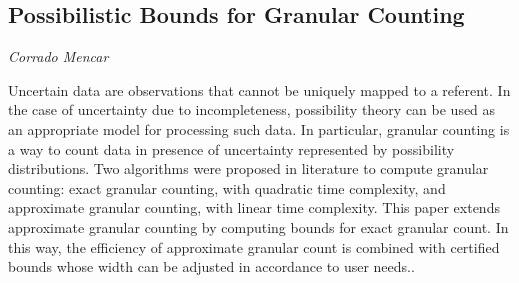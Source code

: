 \documentclass[../booklet.tex]{subfiles}
\begin{document}
\subsection[Possibilistic Bounds for Granular Counting. {\it Corrado Mencar}]{Possibilistic Bounds for Granular Counting}

\begin{center}
  {\it Corrado Mencar}
\end{center}

\vskip 0.8cm


Uncertain data are observations that cannot be uniquely mapped to
a referent. In the case of uncertainty due to incompleteness, possibility
theory can be used as an appropriate model for processing such data.
In particular, granular counting is a way to count data in presence
of uncertainty represented by possibility distributions. Two algorithms
were proposed in literature to compute granular counting: exact granular
counting, with quadratic time complexity, and approximate granular
counting, with linear time complexity. This paper extends approximate
granular counting by computing bounds for exact granular count. In
this way, the efficiency of approximate granular count is combined
with certified bounds whose width can be adjusted in accordance to
user needs..
\end{document}
